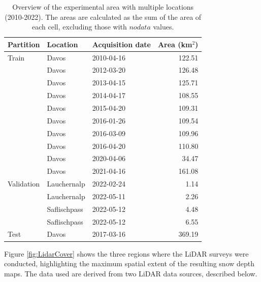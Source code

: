 \documentclass[preprint,12pt]{elsarticle}
\begin{document}
\begin{table}[htbp]
\caption{Overview of the experimental area with multiple locations (2010-2022). The areas are calculated as the sum of the area of each cell, excluding those with $nodata$ values.}
\label{table:areaoverview}
\centering
\small
\begin{tabular}{lllr}
\hline
Partition & Location & Acquisition date  & Area (km$^2$)  \\ 
\hline
Train & Davos & 2010-04-16 & 122.51  \\ 
      & Davos & 2012-03-20 & 126.48  \\ 
      & Davos & 2013-04-15 & 125.71  \\ 
      & Davos & 2014-04-17 & 108.55  \\ 
      & Davos & 2015-04-20 & 109.31  \\ 
      & Davos & 2016-01-26 & 109.54  \\ 
      & Davos & 2016-03-09 & 109.96  \\ 
      & Davos & 2016-04-20 & 110.80  \\ 
      & Davos & 2020-04-06 & 34.47   \\ 
      & Davos & 2021-04-16 & 161.08  \\ 
\hline
Validation & Lauchernalp  & 2022-02-24 & 1.14  \\ 
    & Lauchernalp  & 2022-05-11 & 2.26  \\
    & Saflischpass  & 2022-05-12 & 4.48  \\ 
    & Saflischpass  & 2022-05-12 & 6.55  \\ 
\hline
Test & Davos  & 2017-03-16 & 369.19   \\ \hline
\end{tabular}
\end{table}

Figure \ref{fig:LidarCover} shows the three regions where the LiDAR surveys were conducted, highlighting the maximum spatial extent of the resulting snow depth maps. The data used are derived from two LiDAR data sources, described below.
\end{document}
